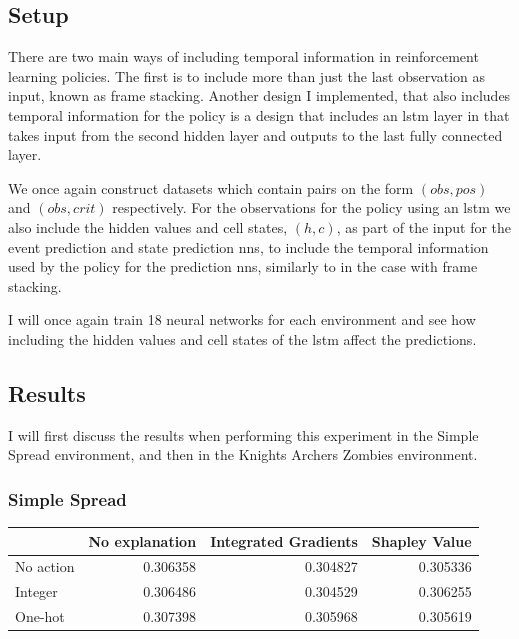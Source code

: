 \documentclass[UKenglish]{uiomasterthesis}
\begin{document}
\subsection{Setup}
There are two main ways of including temporal information in reinforcement learning policies. The first is to include more than just the last observation as input, known as frame stacking. Another design I implemented, that also includes temporal information for the policy is a design that includes an \ac{lstm} layer in that takes input from the second hidden layer and outputs to the last fully connected layer.

We once again construct datasets which contain pairs on the form $(obs, pos)$ and $(obs, crit)$ respectively. For the observations for the policy using an \ac{lstm} we also include the hidden values and cell states, $(h,c)$, as part of the input for the event prediction and state prediction \acp{nn}, to include the temporal information used by the policy for the prediction \acp{nn}, similarly to in the case with frame stacking.

I will once again train 18 neural networks for each environment and see how including the hidden values and cell states of the \ac{lstm} affect the predictions.

\subsection{Results}
I will first discuss the results when performing this experiment in the Simple Spread environment, and then in the Knights Archers Zombies environment.

\subsubsection{Simple Spread}
\begin{center}
\label{tab:state_simpl_lstm}
\begin{tabular}{lrrr}
\toprule
 & No explanation & Integrated Gradients & Shapley Value \\
\midrule
No action & 0.306358 & 0.304827 & 0.305336 \\
Integer & 0.306486 & 0.304529 & 0.306255 \\
One-hot & 0.307398 & 0.305968 & 0.305619 \\
\bottomrule
\end{tabular}
\end{center}
\end{document}
